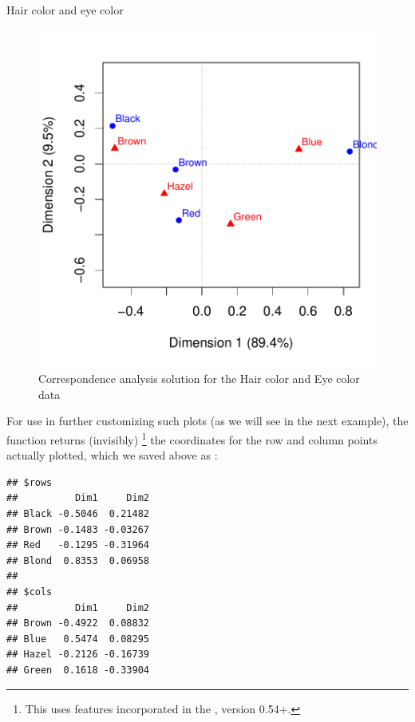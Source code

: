 \documentclass[11pt]{book}
\renewenvironment{knitrout}{\small\renewcommand{\baselinestretch}{.85}}{} %
\begin{document}
\begin{Example}[haireye3]{Hair color and eye color}
\begin{knitrout}
\color{fgcolor}\begin{figure}[!htbp]


\centerline{\includegraphics[width=.7\textwidth]{ch06/fig/ca-haireye-plot} }

\caption[Correspondence analysis solution for the Hair color and Eye color data]{Correspondence analysis solution for the Hair color and Eye color data\label{fig:ca-haireye-plot}}
\end{figure}


\end{knitrout}
For use in further customizing such plots (as we will see in the next example),
the function 
returns (invisibly)%
\footnote{
This uses features incorporated in the , version 0.54+.
}
the coordinates for the row and column points actually plotted,
which we saved above as :
\begin{knitrout}
\color{fgcolor}\begin{kframe}
\begin{alltt}
\end{alltt}
\begin{verbatim}
## $rows
##          Dim1     Dim2
## Black -0.5046  0.21482
## Brown -0.1483 -0.03267
## Red   -0.1295 -0.31964
## Blond  0.8353  0.06958
## 
## $cols
##          Dim1     Dim2
## Brown -0.4922  0.08832
## Blue   0.5474  0.08295
## Hazel -0.2126 -0.16739
## Green  0.1618 -0.33904
\end{verbatim}
\end{kframe}
\end{knitrout}


\end{Example}
\end{document}
